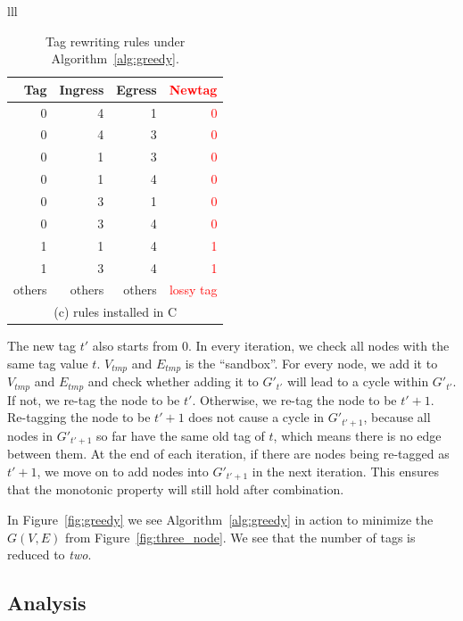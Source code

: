 \begin{table}[t]
\begin{tabular}{lll}
		\begin{tabular}{|r|r|r|r|}
			\hline
			Tag&  Ingress& Egress & \textcolor{red}{Newtag} \\
			\hline
			\hline
			0 & 4 & 1 & \textcolor{red}{0} \\
			\hline
			0 & 4 & 3 & \textcolor{red}{0} \\
			\hline
			0 & 1 & 3 & \textcolor{red}{0} \\
			\hline
			0 & 1 & 4 & \textcolor{red}{0} \\
			\hline
			0 & 3 & 1 & \textcolor{red}{0} \\
			\hline
			0 & 3 & 4 & \textcolor{red}{0} \\
			\hline
			1 & 1 & 4 & \textcolor{red}{1} \\
			\hline
			1 & 3 & 4 & \textcolor{red}{1} \\
			\hline
			others & others & others & \textcolor{red}{lossy tag} \\
			\hline
			\multicolumn{4}{c}{(c) rules installed in C} \\
		\end{tabular}
		
	\end{tabular}
	\caption{Tag rewriting rules under Algorithm~\ref{alg:greedy}.}
	\label{table:tagging_table2}
\end{table}

The new tag $t'$ also starts from 0. In every iteration, we check all nodes with
the same tag value $t$. $V_{tmp}$ and $E_{tmp}$ is the ``sandbox''. For every
node, we add it to $V_{tmp}$ and $E_{tmp}$ and check whether adding it to
$G'_{t'}$ will lead to a cycle within $G'_{t'}$. If not, we re-tag the node to
be $t'$. Otherwise, we re-tag the node to be $t'+1$.  Re-tagging the node to be
$t'+1$ does not cause a cycle in $G'_{t'+1}$, because all nodes in $G'_{t'+1}$
so far have the same old tag of $t$, which means there is no edge between them.
At the end of each iteration, if there are nodes being re-tagged as $t'+1$, we
move on to add nodes into $G'_{t'+1}$ in the next iteration.  This ensures that
the monotonic property will still hold after combination.

In Figure~\ref{fig:greedy} we see Algorithm~\ref{alg:greedy} in action to
minimize the $G(V,E)$ from Figure~\ref{fig:three_node}. We see that the number
of tags is reduced to {\em two}.

\subsection {Analysis}
\label{subsec:caveats}

